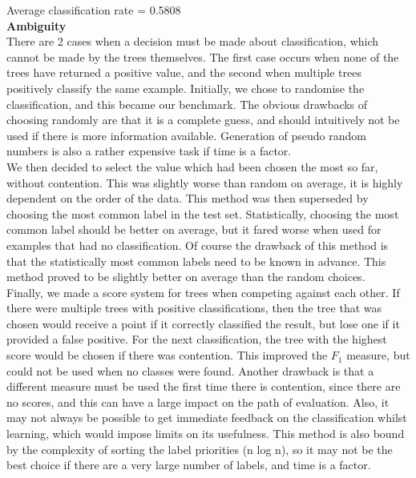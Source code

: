 \documentclass[12pt]{article}
\begin{document}
Average classification rate = 0.5808 \\ 


{\bf Ambiguity} \\

There are 2 cases when a decision must be made about classification, which cannot be made by the trees themselves. The first case occurs when none of the trees have returned a positive value, and the second when multiple trees positively classify the same example. Initially, we chose to randomise the classification, and this became our benchmark. The obvious drawbacks of choosing randomly are that it is a complete guess, and should intuitively not be used if there is more information available. Generation of pseudo random numbers is also a rather expensive task if time is a factor. \\

We then decided to select the value which had been chosen the most so far, without contention. This was slightly worse than random on average, it is highly dependent on the order of the data. This method was then superseded by choosing the most common label in the test set. Statistically, choosing the most common label should be better on average, but it fared worse when used for examples that had no classification. Of course the drawback of this method is that the statistically most common labels need to be known in advance. This method proved to be slightly better on average than the random choices. \\

Finally, we made a score system for trees when competing against each other. If there were multiple trees with positive classifications, then the tree that was chosen would receive a point if it correctly classified the result, but lose one if it provided a false positive. For the next classification, the tree with the highest score would be chosen if there was contention. This improved the \( F_1 \) measure, but could not be used when no classes were found. Another drawback is that a different measure must be used the first time there is contention, since there are no scores, and this can have a large impact on the path of evaluation. Also, it may not always be possible to get immediate feedback on the classification whilst learning, which would impose limits on its usefulness. This method is also bound by the complexity of sorting the label priorities (n log n), so it may not be the best choice if there are a very large number of labels, and time is a factor. \\
\end{document}
